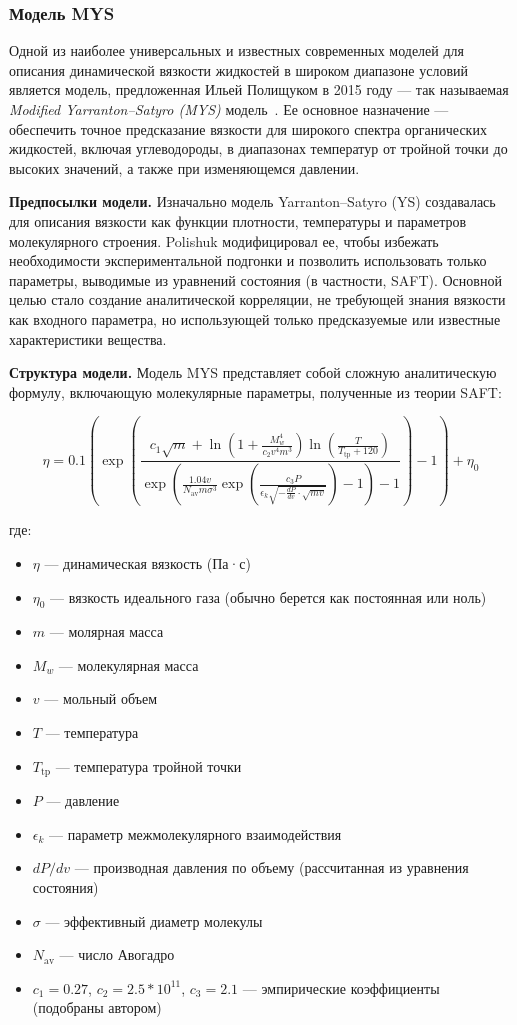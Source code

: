 \documentclass[a4paper,12pt]{article}
\begin{document}
    \subsubsection{Модель MYS}

Одной из наиболее универсальных и известных современных моделей для описания динамической вязкости жидкостей в широком диапазоне условий является модель, предложенная Ильей Полищуком в 2015 году — так называемая \textit{Modified Yarranton–Satyro (MYS)} модель~\cite{polishuk2015viscosity}. Ее основное назначение — обеспечить точное предсказание вязкости для широкого спектра органических жидкостей, включая углеводороды, в диапазонах температур от тройной точки до высоких значений, а также при изменяющемся давлении.

\textbf{Предпосылки модели.}  
Изначально модель Yarranton–Satyro (YS) создавалась для описания вязкости как функции плотности, температуры и параметров молекулярного строения. Polishuk модифицировал ее, чтобы избежать необходимости экспериментальной подгонки и позволить использовать только параметры, выводимые из уравнений состояния (в частности, SAFT). Основной целью стало создание аналитической корреляции, не требующей знания вязкости как входного параметра, но использующей только предсказуемые или известные характеристики вещества.

\textbf{Структура модели.}  
Модель MYS представляет собой сложную аналитическую формулу, включающую молекулярные параметры, полученные из теории SAFT:

\[
\eta = 0.1 \left( \exp \left( \frac{c_1 \sqrt{m} + \ln \left( 1 + \frac{M_w^4}{c_2 v^4 m^3} \right) \ln \left( \frac{T}{T_{\text{tp}} + 120} \right)}{
\exp \left( \frac{1.04 v}{N_{\text{av}} m \sigma^3} \exp \left( \frac{c_3 P}{\epsilon_k \sqrt{-\frac{dP}{dv} \cdot \sqrt{m v}}} \right) - 1 \right) - 1} 
\right) - 1 \right) + \eta_0
\]

где:  
\begin{itemize}
  \item $\eta$ — динамическая вязкость (Па·с)
  \item $\eta_0$ — вязкость идеального газа (обычно берется как постоянная или ноль)
  \item $m$ — молярная масса
  \item $M_w$ — молекулярная масса
  \item $v$ — мольный объем
  \item $T$ — температура
  \item $T_{\text{tp}}$ — температура тройной точки
  \item $P$ — давление
  \item $\epsilon_k$ — параметр межмолекулярного взаимодействия
  \item $dP/dv$ — производная давления по объему (рассчитанная из уравнения состояния)
  \item $\sigma$ — эффективный диаметр молекулы
  \item $N_{\text{av}}$ — число Авогадро
  \item $c_1=0.27$, $c_2=2.5*10^{11}$, $c_3=2.1$ — эмпирические коэффициенты (подобраны автором)
\end{itemize}
\end{document}
